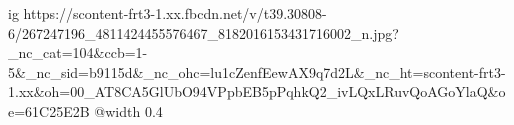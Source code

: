  
 
 
 
 

\ifcmt
  ig https://scontent-frt3-1.xx.fbcdn.net/v/t39.30808-6/267247196_4811424455576467_8182016153431716002_n.jpg?_nc_cat=104&ccb=1-5&_nc_sid=b9115d&_nc_ohc=lu1cZenfEewAX9q7d2L&_nc_ht=scontent-frt3-1.xx&oh=00_AT8CA5GlUbO94VPpbEB5pPqhkQ2_ivLQxLRuvQoAGoYlaQ&oe=61C25E2B
  @width 0.4
\fi
